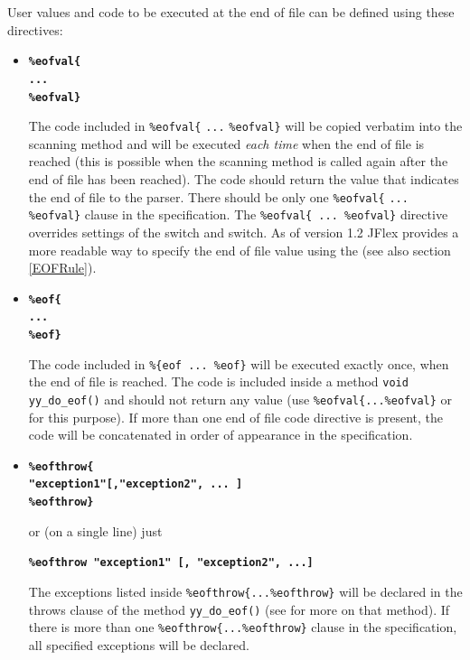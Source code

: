 \documentclass[11pt]{scrartcl}
\newcommand{\trit}{\em}
\begin{document}
User values and code to be executed at the end of file can be defined using these directives:
\begin{itemize}
\label{eofval}
\item
{\bfseries \verb+%eofval{+}\\
{\bfseries \texttt{...}}\\
{\bfseries \verb+%eofval}+}

The code included in \verb+%eofval{+ \texttt{...} \verb+%eofval}+ will
be copied verbatim into the scanning method and will be executed {\trit each time} 
when the end of file is reached (this is possible when
the scanning method is called again after the end of file has been
reached). The code should return the value that indicates the end of
file to the parser.  There should be only one \verb+%eofval{+ 
\texttt{...} \verb+%eofval}+ clause in the specification.  
The \verb+%eofval{ ... %eofval}+ directive overrides settings of the 
\texttt{} switch and \texttt{} switch. 
As of version 1.2 JFlex provides
a more readable way to specify the end of file value using the
 (see also section \ref{EOFRule}).

\item\label{eof}
  {\bfseries \verb+%eof{+}\\
  {\bfseries \texttt{...}}\\
  {\bfseries \verb+%eof}+} 
  
  The code included in \verb+%{eof ... %eof}+ will be executed
  exactly once, when the end of file is reached. The code is included
  inside a method \texttt{void yy\_do\_eof()} and should not return any
  value (use \verb+%eofval{...%eofval}+ or 
   for this purpose). If more than one 
  end of file code directive is present, the code will be concatenated
  in order of appearance in the specification.
 

\item
  {\bfseries \verb+%eofthrow{+}\\
  {\bfseries \texttt{"exception1"[,"exception2", ... ]}}\\
  {\bfseries \verb+%eofthrow}+}

  or (on a single line) just

  {\bfseries \texttt{\%eofthrow "exception1" [,  "exception2", ...]}}
  
  The exceptions listed inside \verb+%eofthrow{...%eofthrow}+ will
  be declared in the throws clause of the method \texttt{yy\_do\_eof()}
  (see  for more on that method).
  If there is more than one \verb+%eofthrow{...%eofthrow}+ clause
  in the specification, all specified exceptions will be declared.
 


\end{itemize}
\end{document}
